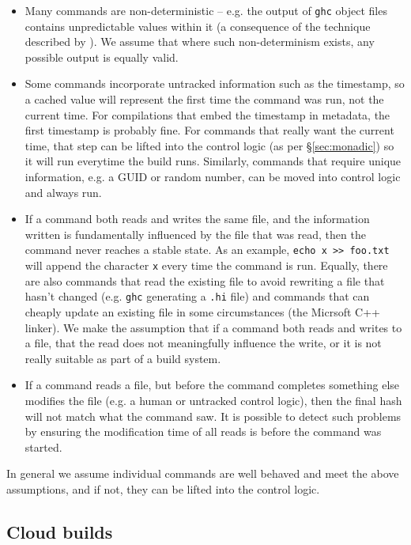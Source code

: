 \begin{itemize}

\item Many commands are non-deterministic -- e.g. the output of \texttt{ghc} object files contains unpredictable values within it (a consequence of the technique described by \citet{lennart:unique_names}). We assume that where such non-determinism exists, any possible output is equally valid.

\item Some commands incorporate untracked information such as the timestamp, so a cached value will represent the first time the command was run, not the current time. For compilations that embed the timestamp in metadata, the first timestamp is probably fine. For commands that really want the current time, that step can be lifted into the control logic (as per \S\ref{sec:monadic}) so it will run everytime the build runs. Similarly, commands that require unique information, e.g. a GUID or random number, can be moved into control logic and always run.

\item If a command both reads and writes the same file, and the information written is fundamentally influenced by the file that was read, then the command never reaches a stable state. As an example, \verb"echo x >> foo.txt" will append the character \texttt{x} every time the command is run. Equally, there are also commands that read the existing file to avoid rewriting a file that hasn't changed (e.g. \texttt{ghc} generating a \texttt{.hi} file) and commands that can cheaply update an existing file in some circumstances (the Micrsoft C++ linker). We make the assumption that if a command both reads and writes to a file, that the read does not meaningfully influence the write, or it is not really suitable as part of a build system.

\item If a command reads a file, but before the command completes something else modifies the file (e.g. a human or untracked control logic), then the final hash will not match what the command saw. It is possible to detect such problems by ensuring the modification time of all reads is before the command was started.
\end{itemize}

In general we assume individual commands are well behaved and meet the above assumptions, and if not, they can be lifted into the control logic.

\subsection{Cloud builds}
\label{sec:cloud_builds}

